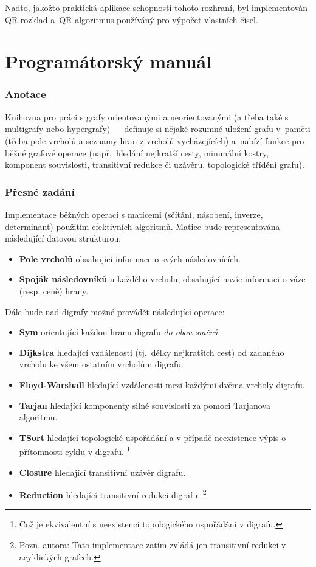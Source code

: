 \documentclass[11pt,a4paper]{article}
\begin{document}
Nadto, jakožto praktická aplikace schopností tohoto rozhraní, byl implementován
QR rozklad a~QR algoritmus používáný pro výpočet vlastních čísel.

\pagebreak

\part{Programátorský manuál}
\section{Anotace}
Knihovna pro práci s grafy orientovanými a neorientovanými (a třeba také s
multigrafy nebo hypergrafy) --- definuje si nějaké rozumné uložení grafu
v~paměti (třeba pole vrcholů a seznamy hran z vrcholů vycházejících) a~nabízí
funkce pro běžné grafové operace (např.\ hledání nejkratší cesty, minimální
kostry, komponent souvislosti, transitivní redukce či uzávěru, topologické
třídění grafu). 

\section{Přesné zadání}
Implementace běžných operací s maticemi (sčítání, násobení, inverze,
determinant) použitím efektivních algoritmů. 
Matice bude representována ná\-sle\-du\-jí\-cí datovou strukturou:

\renewcommand{\labelitemi}{$\spadesuit$}

\begin{itemize}
\item \textbf{Pole vrcholů} obsahující informace o svých následovnících.
\item \textbf{Spoják následovníků} u každého vrcholu, obsahující navíc
informaci o váze (resp. ceně) hrany.
\end{itemize}

Dále bude nad digrafy možné provádět následující operace:

\renewcommand{\labelitemi}{$\clubsuit$}

\begin{itemize}
\item \textbf{Sym} orientující každou hranu digrafu {\sl do obou směrů\/}.
\item \textbf{Dijkstra} hledající vzdálenosti (tj.\ délky nejkratších cest) od
zadaného vrcholu ke všem ostatním vrcholům digrafu.
\item \textbf{Floyd-Warshall} hledající vzdálenosti mezi každými dvěma vrcholy
digrafu.
\item \textbf{Tarjan} hledající komponenty silné souvislosti za pomoci
Tarjanova algoritmu.
\item \textbf{TSort} hledající topologické uspořádání a v případě neexistence
výpis o přítomnosti cyklu v digrafu.%
\footnote{Což je ekvivalentní s neexistencí topologického uspořádání v digrafu.}
\item \textbf{Closure} hledající transitivní uzávěr digrafu.
\item \textbf{Reduction} hledající transitivní redukci digrafu.%
\footnote{Pozn. autora: Tato implementace zatím zvládá jen transitivní redukci
  v acyklických grafech.}
\end{itemize}
\end{document}
